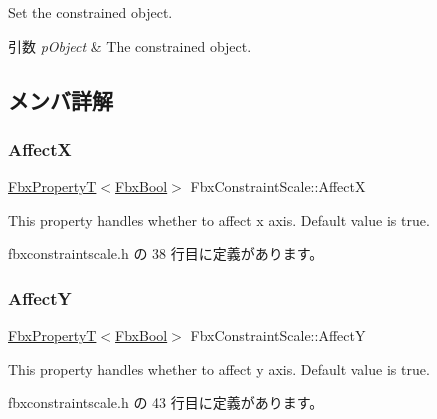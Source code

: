 Set the constrained object. 
\begin{DoxyParams}{引数}
{\em p\+Object} & The constrained object. \\
\hline
\end{DoxyParams}


\subsection{メンバ詳解}
\mbox{\label{class_fbx_constraint_scale_a41d95ab4643d154a400efa926062ffac}} 
\subsubsection{\texorpdfstring{AffectX}{AffectX}}
{\footnotesize\ttfamily \hyperlink{class_fbx_property_t}{Fbx\+PropertyT}$<$\hyperlink{fbxtypes_8h_a92e0562b2fe33e76a242f498b362262e}{Fbx\+Bool}$>$ Fbx\+Constraint\+Scale\+::\+AffectX}

This property handles whether to affect x axis. Default value is true. 

 fbxconstraintscale.\+h の 38 行目に定義があります。

\mbox{\label{class_fbx_constraint_scale_a2249bbb0bd5ba9507fa82e1b66c0b2a2}} 
\subsubsection{\texorpdfstring{AffectY}{AffectY}}
{\footnotesize\ttfamily \hyperlink{class_fbx_property_t}{Fbx\+PropertyT}$<$\hyperlink{fbxtypes_8h_a92e0562b2fe33e76a242f498b362262e}{Fbx\+Bool}$>$ Fbx\+Constraint\+Scale\+::\+AffectY}

This property handles whether to affect y axis. Default value is true. 

 fbxconstraintscale.\+h の 43 行目に定義があります。

\mbox{\label{class_fbx_constraint_scale_af8cc6e516ff4b87331fc12f20af6f235}} 

